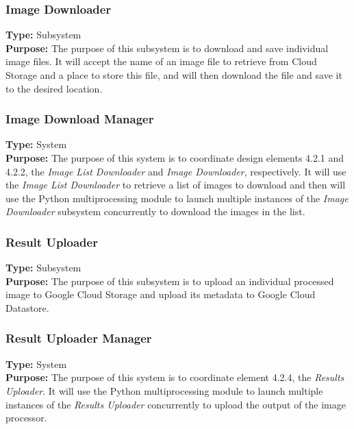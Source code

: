 \documentclass[10pt, onecolumn, draftclsnofoot, letterpaper, compsoc]{IEEEtran}
\begin{document}
    \subsubsection{Image Downloader}
    \textbf{Type:} Subsystem \\
    \textbf{Purpose:} The purpose of this subsystem is to download and save individual image files. It will 
    accept the name of an image file to retrieve from Cloud Storage and a place to store this file, and will 
    then download the file and save it to the desired location. \\

    \subsubsection{Image Download Manager}
    \textbf{Type:} System \\
    \textbf{Purpose:} The purpose of this system is to coordinate design elements 4.2.1 and 4.2.2, the 
    \textit{Image List Downloader} and \textit{Image Downloader}, respectively. It will use the 
    \textit{Image List Downloader} to retrieve a list of images to download and then will use the Python 
    multiprocessing module to launch multiple instances of the \textit{Image Downloader} subsystem 
    concurrently to download the images in the list. \\

    \subsubsection{Result Uploader}
    \textbf{Type:} Subsystem \\
    \textbf{Purpose:} The purpose of this subsystem is to upload an individual processed image to Google Cloud 
    Storage and upload its metadata to Google Cloud Datastore. \\

    \subsubsection{Result Uploader Manager}
    \textbf{Type:} System \\
    \textbf{Purpose:} The purpose of this system is to coordinate element 4.2.4, the \textit{Results Uploader}. 
    It will use the Python multiprocessing module to launch multiple instances of the \textit{Results Uploader} 
    concurrently to upload the output of the image processor. \\
\end{document}
